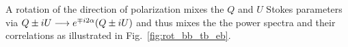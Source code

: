 \documentclass[PICOReport.tex]{subfiles}
\begin{document}
A rotation {\prang} of the direction of polarization mixes the $Q$ and $U$ Stokes parameters via
$Q\pm iU \longrightarrow e^{\mp i 2 \alpha} (Q\pm iU)$
and thus mixes the the power spectra and their correlations as illustrated in Fig.~\ref{fig:rot_bb_tb_eb}.
\end{document}

